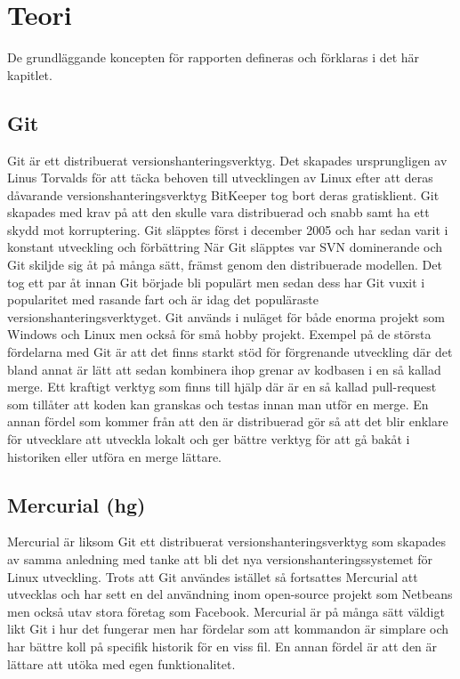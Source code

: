 \section{Teori}
\label{sec:bjorn-theory}
De grundläggande koncepten för rapporten defineras och förklaras i det här kapitlet.

\subsection{Git}
Git är ett distribuerat versionshanteringsverktyg. Det skapades ursprungligen av Linus Torvalds för att täcka behoven till utvecklingen av Linux efter att deras dåvarande versionshanteringsverktyg BitKeeper tog bort deras gratisklient. Git skapades med krav på att den skulle vara distribuerad och snabb samt ha ett skydd mot korruptering. Git släpptes först i december 2005 och har sedan varit i konstant utveckling och förbättring \cite{linux-google} När Git släpptes var SVN dominerande och Git skiljde sig åt på många sätt, främst genom den distribuerade modellen. Det tog ett par åt innan Git började bli populärt men sedan dess har Git vuxit i popularitet med rasande fart och är idag det populäraste versionshanteringsverktyget. Git används i nuläget för både enorma projekt som Windows och Linux men också för små hobby projekt.\cite{vcs-popularity}
Exempel på de största fördelarna med Git är att det finns starkt stöd för förgrenande utveckling där det bland annat är lätt att sedan kombinera ihop grenar av kodbasen i en så kallad merge. Ett kraftigt verktyg som finns till hjälp där är en så kallad pull-request som tillåter att koden kan granskas och testas innan man utför en merge.\cite{pull-request} En annan fördel som kommer från att den är distribuerad gör så att det blir enklare för utvecklare att utveckla lokalt och ger bättre verktyg för att gå bakåt i historiken eller utföra en merge lättare.

\subsection{Mercurial (hg)}
Mercurial är liksom Git ett distribuerat versionshanteringsverktyg som skapades av samma anledning med tanke att bli det nya versionshanteringssystemet för Linux utveckling. Trots att Git användes istället så fortsattes Mercurial att utvecklas och har sett en del användning inom open-source projekt som Netbeans\cite{netbeans-contribute} men också utav stora företag som Facebook\cite{facebook-mercurial}.
Mercurial är på många sätt väldigt likt Git i hur det fungerar men har fördelar som att kommandon är simplare och har bättre koll på specifik historik för en viss fil. En annan fördel är att den är lättare att utöka med egen funktionalitet.\cite{mercurial-book}

